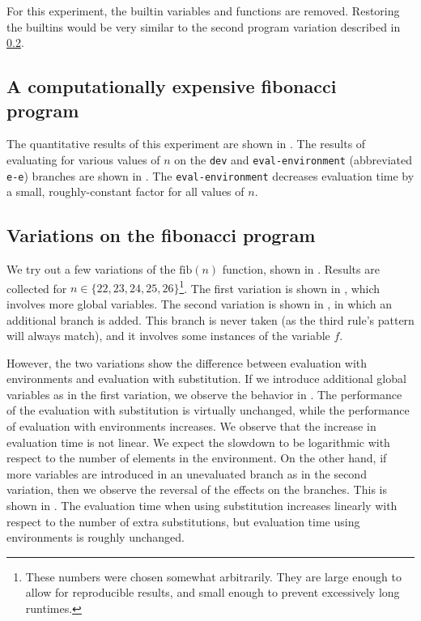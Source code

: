 For this experiment, the builtin variables and functions are removed. Restoring the builtins would be very similar to the second program variation described in \cref{sec:eval-fib-variations}.

\subsection{A computationally expensive fibonacci program}
\label{sec:eval-fib}

The quantitative results of this experiment are shown in . The results of evaluating  for various values of $n$ on the \texttt{dev} and \texttt{eval-environment} (abbreviated \texttt{e-e}) branches are shown in . The \texttt{eval-environment} decreases evaluation time by a small, roughly-constant factor for all values of $n$.

\subsection{Variations on the fibonacci program}
\label{sec:eval-fib-variations}

We try out a few variations of the $\text{fib}(n)$ function, shown in . Results are collected for $n\in\{22,23,24,25,26\}$\footnote{These numbers were chosen somewhat arbitrarily. They are large enough to allow for reproducible results, and small enough to prevent excessively long runtimes.}. The first variation is shown in , which involves more global variables. The second variation is shown in , in which an additional branch is added. This branch is never taken (as the third rule's pattern will always match), and it involves some instances of the variable $f$.

However, the two variations show the difference between evaluation with environments and evaluation with substitution. If we introduce additional global variables as in the first variation, we observe the behavior in . The performance of the evaluation with substitution is virtually unchanged, while the performance of evaluation with environments increases. We observe that the increase in evaluation time is not linear. We expect the slowdown to be logarithmic with respect to the number of elements in the environment. On the other hand, if more variables are introduced in an unevaluated branch as in the second variation, then we observe the reversal of the effects on the branches. This is shown in . The evaluation time when using substitution increases linearly with respect to the number of extra substitutions, but evaluation time using environments is roughly unchanged.

